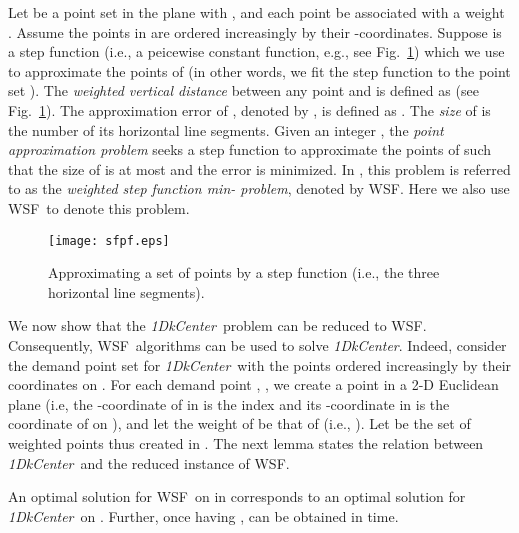 \documentclass{llncs}
\def\wsf{WSF}
\def\problem{{\it 1DkCenter}}
\begin{document}
Let  be a point set in the plane
with , and each point  be associated with a
weight . Assume the points in  are ordered
increasingly by their -coordinates. Suppose  is a step
function (i.e., a peicewise constant function, e.g., see Fig.~\ref{fig:sfpf})
which we use to approximate the points of  (in other
words, we fit the step function  to the point set ). The {\em
weighted vertical distance} between any point  and  is
defined as  (see
Fig.~\ref{fig:sfpf}). The approximation error of , denoted by
, is defined as . The {\em
size} of  is the number of its horizontal line segments. Given an
integer , the {\em point approximation problem} seeks a step
function  to approximate the points of  such that the size of
 is at most  and the error  is minimized. In
\cite{ref:ChenAp091}, this problem is referred to as the {\em
weighted step function min- problem}, denoted by \wsf.
Here we also use \wsf\ to denote this problem.

\begin{figure}[t]
\begin{minipage}[t]{\linewidth}
\begin{center}
\texttt{[image: sfpf.eps]}
\caption{\footnotesize Approximating a set of points by a step function
(i.e., the three horizontal line segments).}
\label{fig:sfpf}
\end{center}
\end{minipage}
\vspace*{-0.15in}
\end{figure}


We now show that the \problem\ problem can be reduced to \wsf.
Consequently, \wsf\ algorithms can be used to solve \problem.
Indeed, consider the demand point set  for
\problem\ with the points ordered increasingly
by their coordinates on . For each demand point ,
, we create a point  in a 2-D
Euclidean plane 
(i.e, the -coordinate of  in  is the index  and
its -coordinate  in  is the coordinate of  on
), and let the weight of  be that of  (i.e.,
). Let  be the set of  weighted points thus
created in . The next lemma states the relation between
\problem\ and the reduced instance of \wsf.

\begin{lemma}\label{lem:00}
An optimal solution  for \wsf\ on  in 
corresponds to an optimal solution  for \problem\ on .
Further, once having ,  can be obtained in 
time.
\end{lemma}
\end{document}
